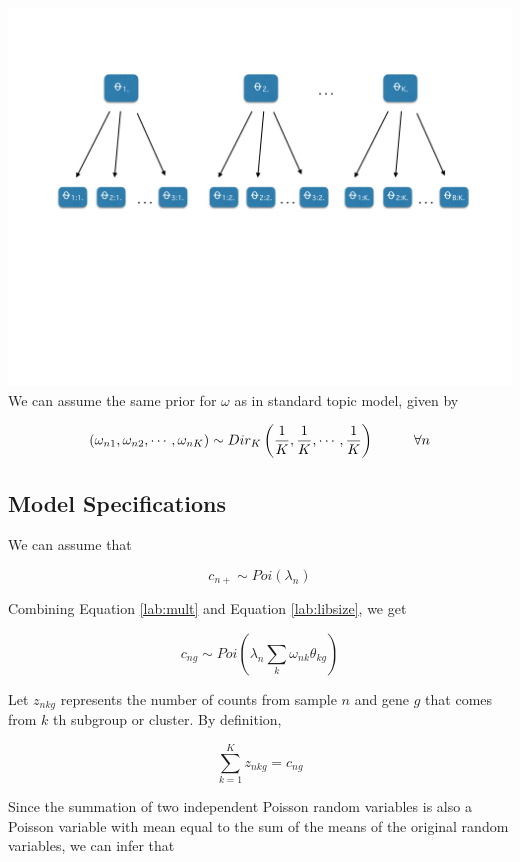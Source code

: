 \documentclass[]{article}
\begin{document}
\includegraphics{../figs/hierarchy_batch.jpeg} We can assume the same
prior for \(\omega\) as in standard topic model, given by

\[ (\omega_{n1}, \omega_{n2}, \cdots, \omega_{nK}) \sim  Dir_{K} \left ( \frac{1}{K}, \frac{1}{K}, \cdots, \frac{1}{K} \right) \hspace{1 cm} \forall n\]

\subsection{Model Specifications}\label{model-specifications}

We can assume that

\begin{equation}
c_{n+} \sim Poi(\lambda_{n}) 
\label{lab:libsize}
\end{equation}

Combining Equation \ref{lab:mult} and Equation \ref{lab:libsize}, we get

\begin{equation}
c_{ng} \sim Poi \left ( \lambda_{n} \sum_{k} \omega_{nk} \theta_{kg} \right)
\end{equation}

Let \(z_{nkg}\) represents the number of counts from sample \(n\) and
gene \(g\) that comes from \(k\) th subgroup or cluster. By definition,

\[ \sum_{k=1}^{K} z_{nkg} = c_{ng}  \]

Since the summation of two independent Poisson random variables is also
a Poisson variable with mean equal to the sum of the means of the
original random variables, we can infer that
\end{document}
